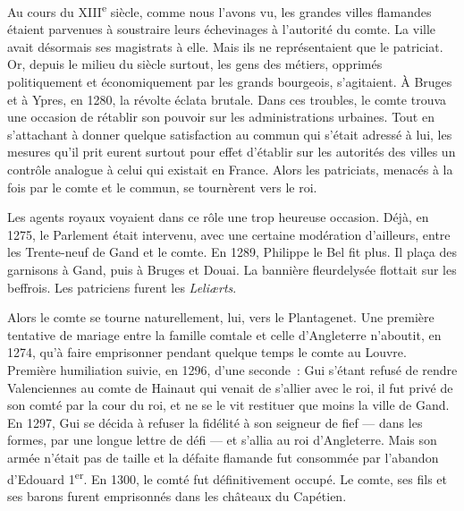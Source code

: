 \documentclass[french,twoside]{book} %
\begin{document}
Au cours du XIII\textsuperscript{e} siècle, comme nous l’avons vu, les grandes villes flamandes étaient parvenues à soustraire leurs échevinages à l’autorité du comte. La ville avait désormais ses magistrats à elle. Mais ils ne représentaient que le patriciat. Or, depuis le milieu du siècle surtout, les gens des métiers, opprimés politiquement et économiquement par les grands bourgeois, s’agitaient. À Bruges et à Ypres, en 1280, la révolte éclata brutale. Dans ces troubles, le comte trouva une occasion de rétablir son pouvoir sur les administrations urbaines. Tout en s’attachant à donner quelque satisfaction au commun qui s’était adressé à lui, les mesures qu’il prit eurent surtout pour effet d’établir sur les autorités des villes un contrôle analogue à celui qui existait en France. Alors les patriciats, menacés à la fois par le comte et le commun, se tournèrent vers le roi.\par
Les agents royaux voyaient dans ce rôle une trop heureuse occasion. Déjà, en 1275, le Parlement était intervenu, avec une certaine modération d’ailleurs, entre les Trente-neuf de Gand et le comte. En 1289, Philippe le Bel fit plus. Il plaça des garnisons à  
\label{p25} Gand, puis à Bruges et Douai. La bannière fleurdelysée flottait sur les beffrois. Les patriciens furent les \emph{Leliærts}.\par
Alors le comte se tourne naturellement, lui, vers le Plantagenet. Une première tentative de mariage entre la famille comtale et celle d’Angleterre n’aboutit, en 1274, qu’à faire emprisonner pendant quelque temps le comte au Louvre. Première humiliation suivie, en 1296, d’une seconde : Gui s’étant refusé de rendre Valenciennes au comte de Hainaut qui venait de s’allier avec le roi, il fut privé de son comté par la cour du roi, et ne se le vit restituer que moins la ville de Gand. En 1297, Gui se décida à refuser la fidélité à son seigneur de fief — dans les formes, par une longue lettre de défi — et s’allia au roi d’Angleterre. Mais son armée n’était pas de taille et la défaite flamande fut consommée par l’abandon d’Edouard 1\textsuperscript{er}. En 1300, le comté fut définitivement occupé. Le comte, ses fils et ses barons furent emprisonnés dans les châteaux du Capétien.\par
\end{document}
